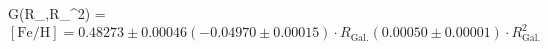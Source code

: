 G(R_,R_^2) = $\mathrm{[Fe/H]} = 0.48273 \pm 0.00046 (-0.04970 \pm 0.00015) \cdot R_\mathrm{Gal.} (0.00050 \pm 0.00001) \cdot R_\mathrm{Gal.}^2$%
